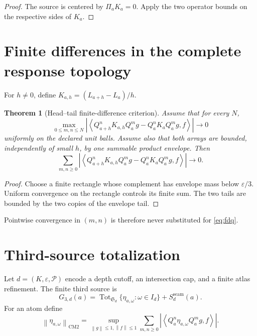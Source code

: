 \documentclass[11pt,reqno]{amsart}
\newtheorem{theorem}{Theorem}[section]
\theoremstyle{definition}
\theoremstyle{remark}
\newcommand{\Tot}{\operatorname{Tot}}
\newcommand{\norm}[1]{\left\lVert #1\right\rVert}
\newcommand{\abs}[1]{\left\lvert #1\right\rvert}
\newcommand{\pair}[2]{\left\langle #1,#2\right\rangle}
\begin{document}
\begin{proof}
The source is centered by $\Pi_aK_a=0$.  Apply the two operator bounds on the
respective sides of $K_a$.
\end{proof}

\section{Finite differences in the complete response topology}\label{sec:fdq}

For $h\ne0$, define $K_{a,h}=(L_{a+h}-L_a)/h$.

\begin{theorem}[Head--tail finite-difference criterion]\label{thm:fdq}
Assume that for every $N$,
\[
 \max_{0\le m,n\le N}
 \abs{\pair{Q_{a+h}^nK_{a,h}Q_a^m g
       -Q_a^nK_aQ_a^m g}{f}}
 \longrightarrow0
\]
uniformly on the declared unit balls.  Assume also that both arrays are
bounded, independently of small $h$, by one summable product envelope.  Then
\begin{equation}\label{eq:fdq}
 \sum_{m,n\ge0}
 \abs{\pair{Q_{a+h}^nK_{a,h}Q_a^m g
       -Q_a^nK_aQ_a^m g}{f}}
 \longrightarrow0.
\end{equation}
\end{theorem}

\begin{proof}
Choose a finite rectangle whose complement has envelope mass below
$\varepsilon/3$.  Uniform convergence on the rectangle controls its finite
sum.  The two tails are bounded by the two copies of the envelope tail.
\end{proof}

Pointwise convergence in $(m,n)$ is therefore never substituted for
\eqref{eq:fdq}.

\section{Third-source totalization}\label{sec:u3}

Let $d=(K,\varepsilon,\mathcal P)$ encode a depth cutoff, an intersection cap,
and a finite atlas refinement.  The finite third source is
\begin{equation}\label{eq:G3d}
 G_{3,d}(a)=
 \Tot_{\mathfrak S_d}\{\eta_{a,\omega}:\omega\in I_d\}
 +S_d^{\mathrm{seam}}(a).
\end{equation}
For an atom define
\[
 \norm{\eta_{a,\omega}}_{\mathrm{CM2}}
 =\sup_{\norm{g}\le1,\norm{f}\le1}
   \sum_{m,n\ge0}
   \abs{\pair{Q_a^n\eta_{a,\omega}Q_a^m g}{f}}.
\]
\end{document}
